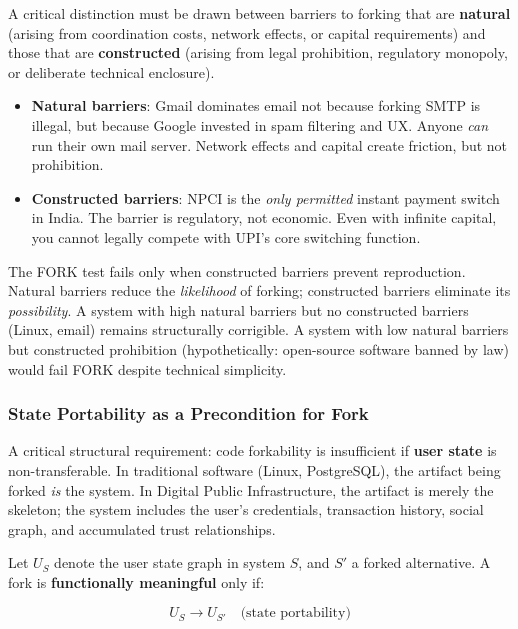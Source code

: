\documentclass{article}
\begin{document}
A critical distinction must be drawn between barriers to forking that are \textbf{natural} (arising from coordination costs, network effects, or capital requirements) and those that are \textbf{constructed} (arising from legal prohibition, regulatory monopoly, or deliberate technical enclosure).

\begin{itemize}
    \item \textbf{Natural barriers}: Gmail dominates email not because forking SMTP is illegal, but because Google invested in spam filtering and UX. Anyone \textit{can} run their own mail server. Network effects and capital create friction, but not prohibition.
    \item \textbf{Constructed barriers}: NPCI is the \textit{only permitted} instant payment switch in India. The barrier is regulatory, not economic. Even with infinite capital, you cannot legally compete with UPI's core switching function.
\end{itemize}

The FORK test fails only when constructed barriers prevent reproduction. Natural barriers reduce the \textit{likelihood} of forking; constructed barriers eliminate its \textit{possibility}. A system with high natural barriers but no constructed barriers (Linux, email) remains structurally corrigible. A system with low natural barriers but constructed prohibition (hypothetically: open-source software banned by law) would fail FORK despite technical simplicity.

\subsubsection{State Portability as a Precondition for Fork}

A critical structural requirement: code forkability is insufficient if \textbf{user state} is non-transferable. In traditional software (Linux, PostgreSQL), the artifact being forked \textit{is} the system. In Digital Public Infrastructure, the artifact is merely the skeleton; the system includes the user's credentials, transaction history, social graph, and accumulated trust relationships.

Let $U_S$ denote the user state graph in system $S$, and $S'$ a forked alternative. A fork is \textbf{functionally meaningful} only if:

\begin{equation}
U_S \to U_{S'} \quad \text{(state portability)}
\label{eq:state-portability}
\end{equation}
\end{document}
